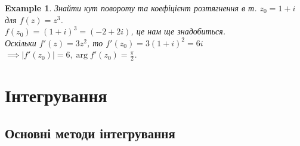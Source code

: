\documentclass[a4paper, 10pt]{article}
\theoremstyle{theoremdd}
\theoremstyle{theoremdd}
\theoremstyle{theoremdd}
\theoremstyle{theoremdd}
\newtheorem{example}[theorem]{Example}
\theoremstyle{theoremdd}
\theoremstyle{theoremdd}
\theoremstyle{theoremdd}
\theoremstyle{theoremdd}
\begin{document}
\begin{example}
Знайти кут повороту та коефіцієнт розтягнення в т. $z_0 = 1+i$ для $f(z) = z^3$.\\
$f(z_0)=(1+i)^3=(-2+2i)$, це нам ще знадобиться.\\
Оскільки $f'(z) = 3z^2$, то $f'(z_0) = 3(1+i)^2 = 6i$
$\displaystyle \implies |f'(z_0)| = 6, \arg f'(z_0) = \frac{\pi}{2}$.
\end{example}
	\newpage
	
	
\section{Інтегрування}
\subsection{Основні методи інтегрування}

\end{document}
